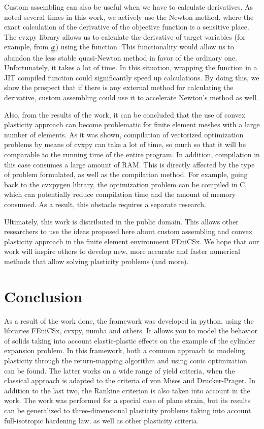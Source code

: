 \documentclass[12pt]{article}
\begin{document}
Custom assembling can also be useful when we have to calculate derivatives. As noted several times in this work, we actively use the Newton method, where the exact calculation of the derivative of the objective function is a sensitive place. The cvxpy library allows us to calculate the derivative of target variables (for example, from $\underline{\underline{\sigma}}$) using the  function. This functionality would allow us to abandon the less stable quasi-Newton method in favor of the ordinary one. Unfortunately, it takes a lot of time. In this situation, wrapping the  function in a JIT compiled function could significantly speed up calculations. By doing this, we show the prospect that if there is any external method for calculating the derivative, custom assembling could use it to accelerate Newton's method as well. 

Also, from the results of the work, it can be concluded that the use of convex plasticity approach can become problematic for finite element meshes with a large number of elements. As it was shown, compilation of vectorized optimization problems by means of cvxpy can take a lot of time, so much so that it will be comparable to the running time of the entire program. In addition, compilation in this case consumes a large amount of RAM. This is directly affected by the type of problem formulated, as well as the compilation method. For example, going back to the cvxpygen library, the optimization problem can be compiled in C, which can potentially reduce compilation time and the amount of memory consumed. As a result, this obstacle requires a separate research.

Ultimately, this work is distributed in the public domain. This allows other researchers to use the ideas proposed here about custom assembling and convex plasticity approach in the finite element environment FEniCSx. We hope that our work will inspire others to develop new, more accurate and faster numerical methods that allow solving plasticity problems (and more).

\newpage
{}
{}
\section*{Conclusion}
As a result of the work done, the framework was developed in python, using the libraries FEniCSx, cvxpy, numba and others. It allows you to model the behavior of solids taking into account elastic-plastic effects on the example of the cylinder expansion problem. In this framework, both a common approach to modeling plasticity through the return-mapping algorithm and using conic optimization can be found. The latter works on a wide range of yield criteria, when the classical approach is adapted to the criteria of von Mises and Drucker-Prager. In addition to the last two, the Rankine criterion is also taken into account in the work. The work was performed for a special case of plane strain, but its results can be generalized to three-dimensional plasticity problems taking into account full-isotropic hardening law, as well as other plasticity criteria.
\end{document}
